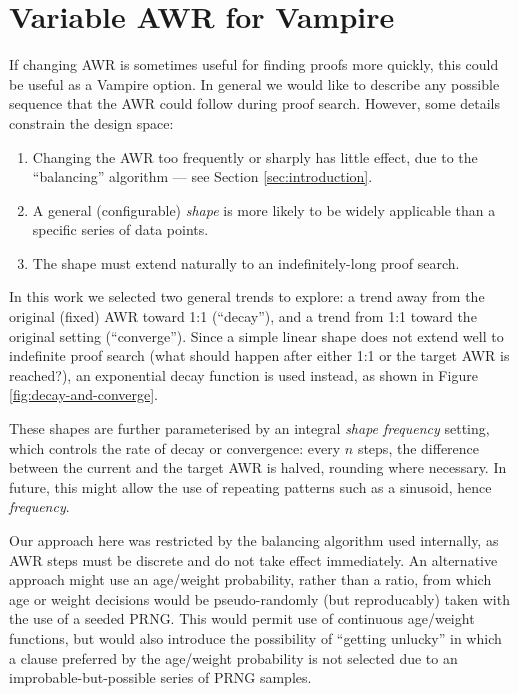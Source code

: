 \documentclass{llncs}
\begin{document}
\section{Variable AWR for Vampire}
If changing AWR is sometimes useful for finding proofs more quickly, this could be useful as a Vampire option.
In general we would like to describe any possible sequence that the AWR could follow during proof search.
However, some details constrain the design space:
\begin{enumerate}
	\item Changing the AWR too frequently or sharply has little effect, due to the ``balancing'' algorithm --- see Section \ref{sec:introduction}.
	\item A general (configurable) \emph{shape} is more likely to be widely applicable than a specific series of data points.
	\item The shape must extend naturally to an indefinitely-long proof search.
\end{enumerate}

In this work we selected two general trends to explore: a trend away from the original (fixed) AWR toward 1:1 (``decay''), and a trend from 1:1 toward the original setting (``converge'').
Since a simple linear shape does not extend well to indefinite proof search (what should happen after either 1:1 or the target AWR is reached?), an exponential decay function is used instead, as shown in Figure \ref{fig:decay-and-converge}.

These shapes are further parameterised by an integral \emph{shape frequency} setting, which controls the rate of decay or convergence: every \(n\) steps, the difference between the current and the target AWR is halved, rounding where necessary.
In future, this might allow the use of repeating patterns such as a sinusoid, hence \emph{frequency}.

Our approach here was restricted by the balancing algorithm used internally, as AWR steps must be discrete and do not take effect immediately.
An alternative approach might use an age/weight probability, rather than a ratio, from which age or weight decisions would be pseudo-randomly (but reproducably) taken with the use of a seeded PRNG.
This would permit use of continuous age/weight functions, but would also introduce the possibility of ``getting unlucky'' in which a clause preferred by the age/weight probability is not selected due to an improbable-but-possible series of PRNG samples.
\end{document}
